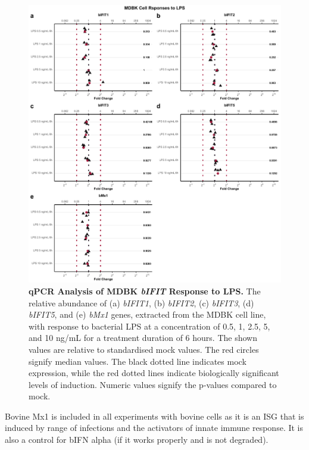 \begin{figure}
    \centering
    \includegraphics[width=1\linewidth]{07. Chapter 2/Figs/02. Induction/02. mdbk_treat_lps.pdf}
    \caption[qPCR Analysis of MDBK \textit{bIFIT} Response to LPS.]{\textbf{qPCR Analysis of MDBK \textit{bIFIT} Response to LPS.} The relative abundance of (a) \textit{bIFIT1}, (b) \textit{bIFIT2}, (c) \textit{bIFIT3}, (d) \textit{bIFIT5}, and (e) \textit{bMx1} genes, extracted from the MDBK cell line, with response to bacterial LPS at a concentration of 0.5, 1, 2.5, 5, and 10 ng/mL for a treatment duration of 6 hours. The shown values are relative to standardised mock values. The red circles signify median values. The black dotted line indicates mock expression, while the red dotted lines indicate biologically significant levels of induction. Numeric values signify the p-values compared to mock.}
    \label{MDBK responses to LPS}
\end{figure}

Bovine Mx1 is included in all experiments with bovine cells as it is an ISG that is induced by range of infections and the activators of innate immune response. It is also a control for bIFN alpha (if it works properly and is not degraded).

